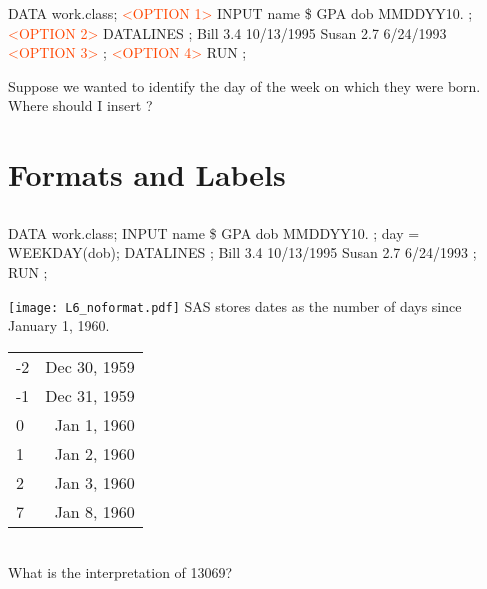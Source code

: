 \begin{frame}[fragile]
\fto
{}
\footnotesize
\begin{code}{.0}
DATA work.class;
  \textcolor{OrangeRed}{<OPTION 1>}
  INPUT name \$ GPA dob MMDDYY10. ;
  \textcolor{OrangeRed}{<OPTION 2>}
  DATALINES ;
  Bill  3.4  10/13/1995
  Susan 2.7  6/24/1993
  \textcolor{OrangeRed}{<OPTION 3>}
  ;
  \textcolor{OrangeRed}{<OPTION 4>}
RUN ;
\end{code}
\emp
\begin{clicker}{Suppose we wanted to identify the day of the week on which they were born.  Where should I insert ?}
\end{clicker}
\end{frame}


\section[Formats and Labels]{Formats and Labels}
\subsection{}
\begin{frame}
\end{frame}


\begin{frame}[fragile]
\footnotesize
\begin{code}{.0}
DATA work.class;
  INPUT name \$ GPA dob MMDDYY10. ;
  day = WEEKDAY(dob);
  DATALINES ;
  Bill  3.4  10/13/1995
  Susan 2.7  6/24/1993
  ;
RUN ;
\end{code}
\vskip10pt
\texttt{[image: L6\_noformat.pdf]}
\emp
{} \hspace{0.1in} \emp
{}
SAS stores dates as the number of days since January 1, 1960. \\
\vskip5pt
\begin{tabular}{lr}
-2 & Dec 30, 1959 \\
-1 & Dec 31, 1959 \\
 0 & Jan 1, 1960 \\
 1 & Jan 2, 1960 \\
 2 & Jan 3, 1960 \\
 7 & Jan 8, 1960 \\
\end{tabular}\\
\vskip5pt
\oyo What is the interpretation of 13069?
\emp
\end{frame}



